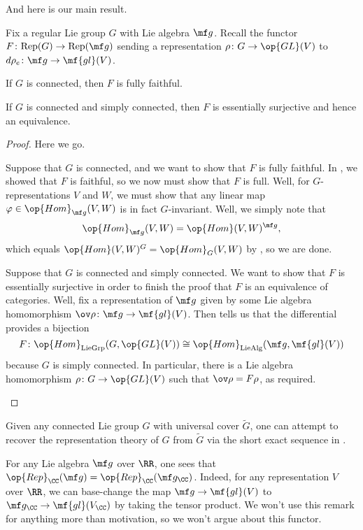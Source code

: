 \documentclass[../notes.tex]{subfiles}
\begin{document}
And here is our main result.
\begin{proposition} \label{prop:rep-theory-to-lie-alg}
	Fix a regular Lie group $G$ with Lie algebra $\mf g$. Recall the functor $F\colon\mathrm{Rep}(G)\to\mathrm{Rep}(\mf g)$ sending a representation $\rho\colon G\to\op{GL}(V)$ to $d\rho_e\colon\mf g\to\mf{gl}(V)$.
	\begin{listalph}
		\item If $G$ is connected, then $F$ is fully faithful.
		\item If $G$ is connected and simply connected, then $F$ is essentially surjective and hence an equivalence.
	\end{listalph}
\end{proposition}
\begin{proof}
	Here we go.
	\begin{listalph}
		\item Suppose that $G$ is connected, and we want to show that $F$ is fully faithful. In , we showed that $F$ is faithful, so we now must show that $F$ is full. Well, for $G$-representations $V$ and $W$, we must show that any linear map $\varphi\in\op{Hom}_{\mf g}(V,W)$ is in fact $G$-invariant. Well, we simply note that
		\[\op{Hom}_{\mf g}(V,W)=\op{Hom}(V,W)^{\mf g},\]
		which equals $\op{Hom}(V,W)^G=\op{Hom}_G(V,W)$ by , so we are done.

		\item Suppose that $G$ is connected and simply connected. We want to show that $F$ is essentially surjective in order to finish the proof that $F$ is an equivalence of categories. Well, fix a representation of $\mf g$ given by some Lie algebra homomorphism $\ov\rho\colon\mf g\to\mf{gl}(V)$. Then  tells us that the differential provides a bijection
		\[F\colon\op{Hom}_{\mathrm{LieGrp}}(G,\op{GL}(V))\cong\op{Hom}_{\mathrm{LieAlg}}(\mf g,\mf{gl}(V))\]
		because $G$ is simply connected. In particular, there is a Lie algebra homomorphism $\rho\colon G\to\op{GL}(V)$ such that $\ov\rho=F\rho$, as required.
		\qedhere
	\end{listalph}
\end{proof}
\begin{remark}
	Given any connected Lie group $G$ with universal cover $\widetilde G$, one can attempt to recover the representation theory of $G$ from $\widetilde G$ via the short exact sequence in .
\end{remark}
\begin{remark}
	For any Lie algebra $\mf g$ over $\RR$, one sees that $\op{Rep}_\CC(\mf g)=\op{Rep}_\CC(\mf g_\CC)$. Indeed, for any representation $V$ over $\RR$, we can base-change the map $\mf g\to\mf{gl}(V)$ to $\mf g_\CC\to\mf{gl}(V_\CC)$ by taking the tensor product. We won't use this remark for anything more than motivation, so we won't argue about this functor.
\end{remark}
\end{document}
